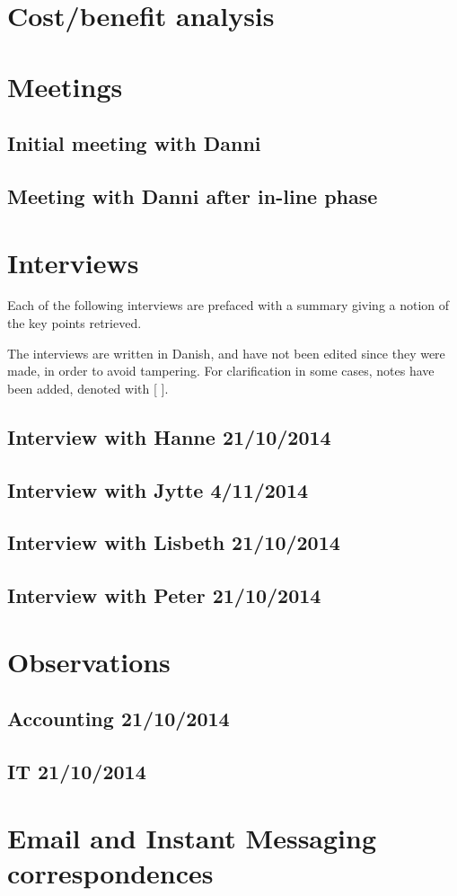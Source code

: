 \chapter{Cost/benefit analysis}

\chapter{Meetings}
\section{Initial meeting with Danni}

\section{Meeting with Danni after in-line phase}

\chapter{Interviews}
\label{app:interviews}
Each of the following interviews are prefaced with a summary giving a notion of the key points retrieved.

The interviews are written in Danish, and have not been edited since they were made, in order to avoid tampering.
For clarification in some cases, notes have been added, denoted with [ ].

\section{Interview with Hanne 21/10/2014}

\section{Interview with Jytte 4/11/2014}

\section{Interview with Lisbeth 21/10/2014}

\section{Interview with Peter 21/10/2014}


\chapter{Observations}
\section{Accounting 21/10/2014}

\section{IT 21/10/2014}


\chapter{Email and Instant Messaging correspondences}
